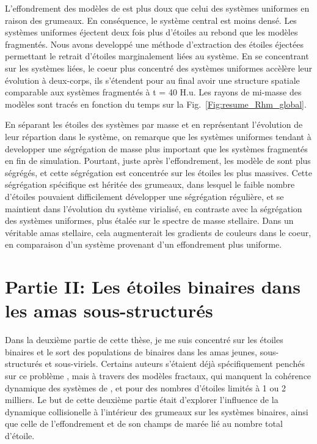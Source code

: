 L'effondrement des mod\`eles de \HubLem est plus doux que celui des syst\`emes uniformes en raison des grumeaux. En cons\'equence, le syst\`eme central est moins dens\'e. Les syst\`emes uniformes \'ejectent deux fois plus d'\'etoiles au rebond que les mod\`eles fragment\'es. Nous avons developp\'e une m\'ethode d'extraction des \'etoiles \'eject\'ees permettant le retrait d'\'etoiles marginalement li\'ees au syst\`eme. En se concentrant sur les syst\`emes li\'ees, le coeur plus concentr\'e des syst\`emes uniformes acc\`el\`ere leur \'evolution \`a deux-corps, ils s'\'etendent pour au final avoir une structure spatiale comparable aux syst\`emes fragment\'es \`a t = 40 H.u. Les rayons de mi-masse des modèles sont tracés en fonction du temps sur la Fig.~\ref{Fig:resume_Rhm_global}.

En s\'eparant les \'etoiles des syst\`emes par masse et en repr\'esentant l'\'evolution de leur r\'epartion dans le syst\`eme, on remarque que les syst\`emes uniformes tendant \`a developper une s\'egr\'egation de masse plus important que les syst\`emes fragment\'es en fin de simulation. Pourtant, juste apr\`es l'effondrement, les mod\`ele de \HubLem sont plus s\'egr\'eg\'es, et cette s\'egr\'egation est concentr\'ee sur les \'etoiles les plus massives. Cette s\'egr\'egation sp\'ecifique est h\'erit\'ee des grumeaux, dans lesquel le faible nombre d'\'etoiles pouvaient difficilement d\'evelopper une s\'egr\'egation r\'eguli\`ere, et se maintient dans l'\'evolution du syst\`eme virialis\'e, en contraste avec la s\'egr\'egation des syst\`emes uniformes, plus \'etal\'ee sur le spectre de masse stellaire. Dans un v\'eritable amas stellaire, cela augmenterait les gradients de couleurs dans le coeur, en comparaison d'un syst\`eme provenant d'un effondrement plus uniforme.



\section{Partie II: Les \'etoiles binaires dans les amas sous-structur\'es}

Dans la deuxi\`eme partie de cette th\`ese, je me suis concentr\'e sur les \'etoiles binaires et le sort des populations de binaires dans les amas jeunes, sous-structur\'es et sous-viriels. Certains auteurs s'\'etaient d\'ej\`a sp\'ecifiquement pench\'es sur ce probl\`eme \citep{Parker2011}, mais \`a travers des mod\`eles fractaux, qui manquent la coh\'erence dynamique des syst\`emes de \HubLem, et pour des nombres d'\'etoiles limit\'es \`a 1 ou 2 milliers. Le but de cette deuxi\`eme partie \'etait d'explorer l'influence de la dynamique collisionelle \`a l’int\'erieur des grumeaux sur les syst\`emes binaires, ainsi que celle de l'effondrement et de son champs de mar\'ee li\'e au nombre total d'\'etoile.

